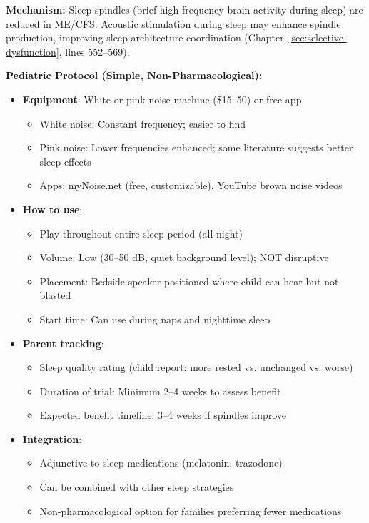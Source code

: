 \begin{recommendation}
\label{rec:sleep-spindle-ped-severe}

\textbf{Mechanism:} Sleep spindles (brief high-frequency brain activity during sleep) are reduced in ME/CFS. Acoustic stimulation during sleep may enhance spindle production, improving sleep architecture coordination (Chapter~\ref{sec:selective-dysfunction}, lines 552--569).

\textbf{Pediatric Protocol (Simple, Non-Pharmacological):}

\begin{itemize}
    \item \textbf{Equipment}: White or pink noise machine (\$15--50) or free app
    \begin{itemize}
        \item White noise: Constant frequency; easier to find
        \item Pink noise: Lower frequencies enhanced; some literature suggests better sleep effects
        \item Apps: myNoise.net (free, customizable), YouTube brown noise videos
    \end{itemize}

    \item \textbf{How to use}:
    \begin{itemize}
        \item Play throughout entire sleep period (all night)
        \item Volume: Low (30--50 dB, quiet background level); NOT disruptive
        \item Placement: Bedside speaker positioned where child can hear but not blasted
        \item Start time: Can use during naps and nighttime sleep
    \end{itemize}

    \item \textbf{Parent tracking}:
    \begin{itemize}
        \item Sleep quality rating (child report: more rested vs. unchanged vs. worse)
        \item Duration of trial: Minimum 2--4 weeks to assess benefit
        \item Expected benefit timeline: 3--4 weeks if spindles improve
    \end{itemize}

    \item \textbf{Integration}:
    \begin{itemize}
        \item Adjunctive to sleep medications (melatonin, trazodone)
        \item Can be combined with other sleep strategies
        \item Non-pharmacological option for families preferring fewer medications
    \end{itemize}
\end{itemize}


\end{recommendation}

